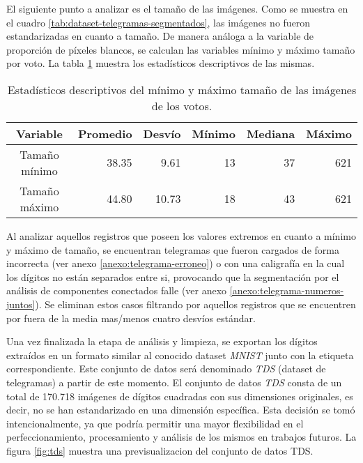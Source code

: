 El siguiente punto a analizar es el tamaño de las imágenes. Como se muestra en el cuadro
\ref{tab:dataset-telegramas-segmentados}, las imágenes no fueron estandarizadas en cuanto a tamaño. De manera análoga a
la variable de proporción de píxeles blancos, se calculan las variables mínimo y máximo tamaño por voto. La tabla
\ref{tab:describe-min-max-size} muestra los estadísticos descriptivos de las mismas.

\begin{table}[H]
    \centering
    \begin{tabular}{crrrrr}
        \toprule
        Variable      & Promedio & Desvío & Mínimo & Mediana & Máximo \\
        \midrule
        Tamaño mínimo & 38.35    & 9.61   & 13     & 37      & 621    \\
        Tamaño máximo & 44.80    & 10.73  & 18     & 43      & 621    \\
        \bottomrule
    \end{tabular}
    \caption[Estadísticos descriptivos de los dígitos]{Estadísticos descriptivos del mínimo y máximo tamaño de las imágenes de los votos.}
    \label{tab:describe-min-max-size}
\end{table}

Al analizar aquellos registros que poseen los valores extremos en cuanto a mínimo y máximo de tamaño, se encuentran
telegramas que fueron cargados de forma incorrecta (ver anexo \ref{anexo:telegrama-erroneo}) o con una caligrafía en la
cual los dígitos no están separados entre si, provocando que la segmentación por el análisis de componentes conectados
falle (ver anexo \ref{anexo:telegrama-numeros-juntos}). Se eliminan estos casos filtrando por aquellos registros que se
encuentren por fuera de la media mas/menos cuatro desvíos estándar.

Una vez finalizada la etapa de análisis y limpieza, se exportan los dígitos extraídos en un formato similar al conocido
dataset {\it MNIST} junto con la etiqueta correspondiente. Este conjunto de datos será denominado {\it TDS} (dataset de
telegramas) a partir de este momento. El conjunto de datos {\it TDS} consta de un total de 170.718 imágenes de dígitos
cuadradas con sus dimensiones originales, es decir, no se han estandarizado en una dimensión específica. Esta decisión
se tomó intencionalmente, ya que podría permitir una mayor flexibilidad en el perfeccionamiento, procesamiento y
análisis de los mismos en trabajos futuros. La figura \ref{fig:tds} muestra una previsualizacion del conjunto de datos
TDS.


